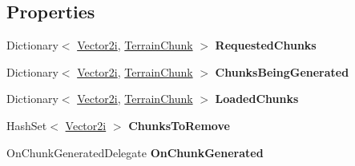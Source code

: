\subsection*{Properties}
\begin{DoxyCompactItemize}
\item 
\mbox{\label{class_terrain_generator_1_1_chunk_cache_af0bfe6a9cf852531c84070c7d4412772}} 
Dictionary$<$ \hyperlink{class_terrain_generator_1_1_vector2i}{Vector2i}, \hyperlink{class_terrain_generator_1_1_terrain_chunk}{Terrain\+Chunk} $>$ {\bfseries Requested\+Chunks}
\item 
\mbox{\label{class_terrain_generator_1_1_chunk_cache_a19af08581f373d9fd6416389d2e88300}} 
Dictionary$<$ \hyperlink{class_terrain_generator_1_1_vector2i}{Vector2i}, \hyperlink{class_terrain_generator_1_1_terrain_chunk}{Terrain\+Chunk} $>$ {\bfseries Chunks\+Being\+Generated}
\item 
\mbox{\label{class_terrain_generator_1_1_chunk_cache_a428248110b685a5c7d0b7efadd6c6681}} 
Dictionary$<$ \hyperlink{class_terrain_generator_1_1_vector2i}{Vector2i}, \hyperlink{class_terrain_generator_1_1_terrain_chunk}{Terrain\+Chunk} $>$ {\bfseries Loaded\+Chunks}
\item 
\mbox{\label{class_terrain_generator_1_1_chunk_cache_a112cefbe58c6cc7613caf01ec1ca70f4}} 
Hash\+Set$<$ \hyperlink{class_terrain_generator_1_1_vector2i}{Vector2i} $>$ {\bfseries Chunks\+To\+Remove}
\item 
\mbox{\label{class_terrain_generator_1_1_chunk_cache_a08cafbe5bb47c7e87dcceaeaaead881e}} 
On\+Chunk\+Generated\+Delegate {\bfseries On\+Chunk\+Generated}
\end{DoxyCompactItemize}
